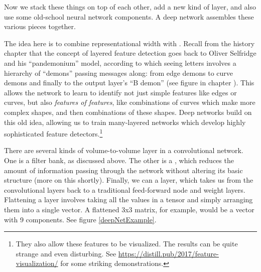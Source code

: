 Now we stack these things on top of each other, add a new kind of layer, and also use some old-school neural network components. A deep network assembles these various pieces together.

The idea here is to combine representational width with . 
Recall from the history chapter that the concept of layered feature detection goes back to Oliver Selfridge and his ``pandemonium'' model, according to which seeing letters involves a hierarchy of ``demons'' passing messages along: from edge demons to curve demons and finally to the output layer's ``B demon'' (see figure  in chapter ). This allows the network to learn to identify not just simple features like edges or curves, but also \emph{features of features}, like combinations of curves which make more complex shapes, and then combinations of these shapes. Deep networks build on this old idea, allowing us to train many-layered networks which develop highly sophisticated feature detectors.\footnote{They also allow these features to be visualized. The results can be quite strange and even disturbing. See \url{https://distill.pub/2017/feature-visualization/} for some striking demonstrations.}  

There are several kinds of volume-to-volume layer in a convolutional network. One is a filter bank, as discussed above. The other is a , which reduces the amount of information passing through the network without altering its basic structure (more on this shortly). Finally, we can  a layer, which takes us from the convolutional layers back to a traditional feed-forward  node and weight layers. Flattening a layer involves taking all the values in a tensor and simply arranging them into a single vector. A flattened 3x3 matrix, for example, would be a vector with 9 components. See figure \ref{deepNetExample}. 


